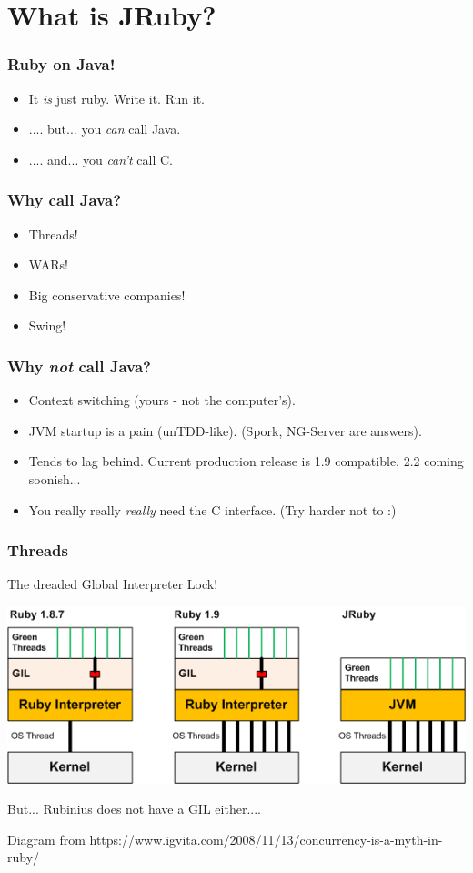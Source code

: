 




\begin{frame}
  \titlepage
\end{frame}

\section{What is JRuby?}
\begin{frame}\frametitle{Ruby on Java!}
\begin{itemize}
  \item It \emph{is} just ruby. Write it. Run it.
  \item .... but... you \emph{can} call Java.
  \item .... and... you \emph{can't} call C.
\end{itemize}
\end{frame}
\begin{frame}\frametitle{Why call Java?}
  \begin{itemize}
    \item Threads!
    \item WARs!
    \item Big conservative companies!
    \item Swing!
  \end{itemize}
\end{frame}
\begin{frame}\frametitle{Why \emph{not} call Java?}
  \begin{itemize}
    \item Context switching (yours - not the computer's).
    \item JVM startup is a pain (unTDD-like). (Spork, NG-Server are answers).
    \item Tends to lag behind. Current production release is 1.9 compatible. 2.2 coming soonish...
    \item You really really \emph{really} need the C interface. (Try harder not to :)
  \end{itemize}
\end{frame}
\begin{frame}\frametitle{Threads}
  The dreaded Global Interpreter Lock!
  \begin{center}
  \includegraphics[scale=.5]{diagrams/ruby-gil.png}
  \end{center}
  But... Rubinius does not have a GIL either....


{\tiny Diagram from https://www.igvita.com/2008/11/13/concurrency-is-a-myth-in-ruby/}
\end{frame}
